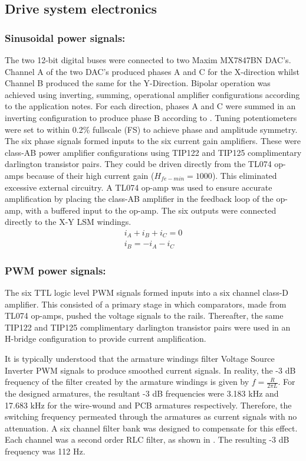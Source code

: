 \documentclass[10pt,twocolumn]{witseiepaper}
\begin{document}
\subsection{Drive system electronics}

\subsubsection*{Sinusoidal power signals:}
The two 12-bit digital buses were connected to two Maxim MX7847BN DAC's.
Channel A of the two DAC's produced phases A and C for the X-direction whilst
Channel B produced the same for the Y-Direction.  Bipolar operation was
achieved using inverting, summing, operational amplifier configurations
according to the application notes.  For each direction, phases A and C were
summed in an inverting configuration to produce phase B according to
.  Tuning potentiometers were set to within 0.2\% fullscale
(FS) to achieve phase and amplitude symmetry.  The six phase signals formed
inputs to the six current gain amplifiers.  These were class-AB power
amplifier configurations using TIP122 and TIP125 complimentary darlington
transistor pairs.  They could be driven directly from the TL074 op-amps
because of their high current gain ($H_{fe-min}=1000$).  This eliminated
excessive external circuitry.  A TL074 op-amp was used to ensure accurate
amplification by placing the class-AB amplifier in the feedback loop of the
op-amp, with a buffered input to the op-amp.  The six outputs were connected
directly to the X-Y LSM windings.  \begin{eqnarray}
	i_A+i_B+i_C = 0\nonumber\\
	i_B = -i_A-i_C\label{eqn:3Phase}
\end{eqnarray}
\subsubsection*{PWM power signals:}
The six TTL logic level PWM signals formed inputs into a six channel class-D
amplifier.  This consisted of a primary stage in which comparators, made from
TL074 op-amps, pushed the voltage signals to the rails.  Thereafter, the same
TIP122 and TIP125 complimentary darlington transistor pairs were used in an
H-bridge configuration to provide current amplification.

It is typically understood that the armature windings filter Voltage Source
Inverter PWM signals to produce smoothed current signals.  In reality, the
-3 dB frequency of the filter created by the armature windings is given by
$f=\frac{R}{2\pi L}$.  For the designed armatures, the resultant -3 dB
frequencies were 3.183 kHz and 17.683 kHz for the wire-wound and PCB armatures
respectively.  Therefore, the switching frequency permeated through the
armatures as current signals with no attenuation.  A six channel filter bank
was designed to compensate for this effect.  Each channel was a second order
RLC filter, as shown in .  The resulting -3 dB frequency was
112 Hz.
\end{document}

